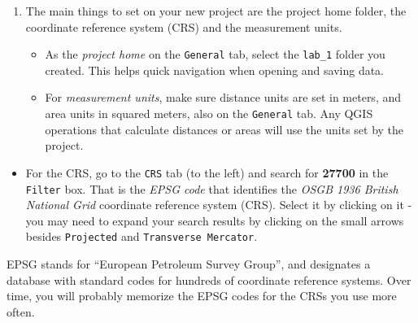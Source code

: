 \documentclass[
  letterpaper,
  DIV=11,
  numbers=noendperiod]{scrreprt}
\providecommand{\tightlist}{%
  \setlength{\itemsep}{0pt}\setlength{\parskip}{0pt}}\usepackage{longtable,booktabs,array}
\begin{document}
\begin{enumerate}
\def\labelenumi{(\arabic{enumi})}
\setcounter{enumi}{11}
\item
  The main things to set on your new project are the project home
  folder, the coordinate reference system (CRS) and the measurement
  units.

  \begin{itemize}
  \item
    As the \emph{project home} on the \texttt{General} tab, select the
    \texttt{lab\_1} folder you created. This helps quick navigation when
    opening and saving data.
  \item
    For \emph{measurement units}, make sure distance units are set in
    meters, and area units in squared meters, also on the
    \texttt{General} tab. Any QGIS operations that calculate distances
    or areas will use the units set by the project.
  \end{itemize}
\end{enumerate}

\begin{itemize}
\tightlist
\item
  For the CRS, go to the \texttt{CRS} tab (to the left) and search for
  \textbf{27700} in the \texttt{Filter} box. That is the \emph{EPSG
  code} that identifies the \emph{OSGB 1936 British National Grid}
  coordinate reference system (CRS). Select it by clicking on it - you
  may need to expand your search results by clicking on the small arrows
  besides \texttt{Projected} and \texttt{Transverse\ Mercator}.
\end{itemize}

\begin{tcolorbox}[enhanced jigsaw, coltitle=black, toprule=.15mm, breakable, opacitybacktitle=0.6, left=2mm, colback=white, leftrule=.75mm, rightrule=.15mm, colbacktitle=quarto-callout-note-color!10!white, toptitle=1mm, titlerule=0mm, colframe=quarto-callout-note-color-frame, arc=.35mm, bottomtitle=1mm, opacityback=0, bottomrule=.15mm, title=\textcolor{quarto-callout-note-color}{\faInfo}\hspace{0.5em}{Note}]

EPSG stands for ``European Petroleum Survey Group'', and designates a
database with standard codes for hundreds of coordinate reference
systems. Over time, you will probably memorize the EPSG codes for the
CRSs you use more often.

\end{tcolorbox}
\end{document}
